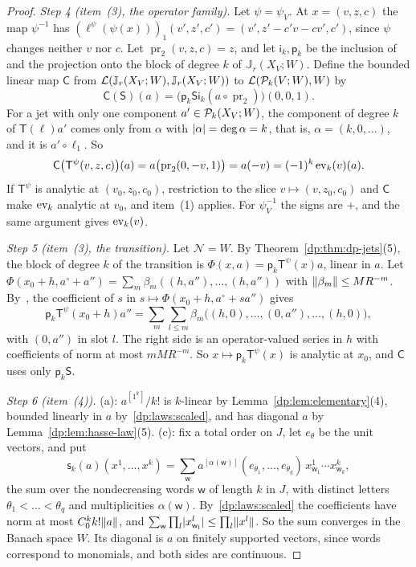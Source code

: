 \begin{proof}
\emph{Step 4 (item~(3), the operator family).} Let $\psi=\psi_V$. At $x=(v,z,c)$ the map $\psi^{-1}$ has $(\ell^\psi(\psi(x)))_1(v',z',c')=(v',z'-c'v-cv',c')$, since $\psi$ changes neither $v$ nor $c$. Let $\operatorname{pr}_2(v,z,c)=z$, and let $\mathsf i_k,\mathsf p_k$ be the inclusion of and the projection onto the block of degree $k$ of $\mathbb J_r(X_V;W)$. Define the bounded linear map $\mathsf C$ from $\mathcal L(\mathbb J_r(X_V;W),\mathbb J_r(X_V;W))$ to $\mathcal L(\mathcal P_k(V;W),W)$ by
\[
 \mathsf C(\mathsf S)(a)=\bigl(\mathsf p_k\mathsf S\mathsf i_k(a\circ\operatorname{pr}_2)\bigr)(0,0,1).
\]
For a jet with only one component $a'\in\mathcal P_k(X_V;W)$, the component of degree $k$ of $\mathsf T(\ell)a'$ comes only from $\alpha$ with $\lvert \alpha\rvert=\deg\alpha=k$, that is, $\alpha=(k,0,\dots)$, and it is $a'\circ\ell_1$. So
\begin{equation}\label{dp:13:eq:compression}
 \mathsf C\bigl(\mathsf T^\psi(v,z,c)\bigr)(a)=a\bigl(\operatorname{pr}_2(0,-v,1)\bigr)=a(-v)=(-1)^k\operatorname{ev}_k(v)(a).
\end{equation}
If $\mathsf T^\psi$ is analytic at $(v_0,z_0,c_0)$, restriction to the slice $v\mapsto(v,z_0,c_0)$ and $\mathsf C$ make $\operatorname{ev}_k$ analytic at $v_0$, and item~(1) applies. For $\psi_V^{-1}$ the signs are $+$, and the same argument gives $\operatorname{ev}_k(v)$.

\emph{Step 5 (item~(3), the transition).} Let $\mathcal N=W$. By Theorem~\ref{dp:thm:dp-jets}(5), the block of degree $k$ of the transition is $\Phi(x,a)=\mathsf p_k\mathsf T^\psi(x)a$, linear in $a$. Let $\Phi(x_0+h,a^\circ+a'')=\sum_m\beta_m((h,a''),\dots,(h,a''))$ with $\lVert \beta_m\rVert\le MR^{-m}$. By~\cite[Lemma~A.1]{I}, the coefficient of $s$ in $s\mapsto\Phi(x_0+h,a^\circ+sa'')$ gives
\[
 \mathsf p_k\mathsf T^\psi(x_0+h)a''=\sum_m\sum_{l\le m}\beta_m\bigl((h,0),\dots,(0,a''),\dots,(h,0)\bigr),
\]
with $(0,a'')$ in slot $l$. The right side is an operator-valued series in $h$ with coefficients of norm at most $mMR^{-m}$. So $x\mapsto\mathsf p_k\mathsf T^\psi(x)$ is analytic at $x_0$, and $\mathsf C$ uses only $\mathsf p_k\mathsf S$.

\emph{Step 6 (item~(4)).} (a): $a^{[1^k]}/k!$ is $k$-linear by Lemma~\ref{dp:lem:elementary}(4), bounded linearly in $a$ by~\eqref{dp:laws:scaled}, and has diagonal $a$ by Lemma~\ref{dp:lem:hasse-law}(5). (c): fix a total order on $J$, let $e_\theta$ be the unit vectors, and put
\[
 \mathsf s_k(a)(x^1,\dots,x^k)=\sum_{\mathsf w}a^{[\alpha(\mathsf w)]}(e_{\theta_1},\dots,e_{\theta_q})\,x^1_{\mathsf w_1}\cdots x^k_{\mathsf w_k},
\]
the sum over the nondecreasing words $\mathsf w$ of length $k$ in $J$, with distinct letters $\theta_1<\dots<\theta_q$ and multiplicities $\alpha(\mathsf w)$. By~\eqref{dp:laws:scaled} the coefficients have norm at most $C_0^kk!\lVert a\rVert$, and $\sum_{\mathsf w}\prod_l\lvert x^l_{\mathsf w_l}\rvert\le\prod_l\lVert x^l\rVert$. So the sum converges in the Banach space $W$. Its diagonal is $a$ on finitely supported vectors, since words correspond to monomials, and both sides are continuous.


\end{proof}
